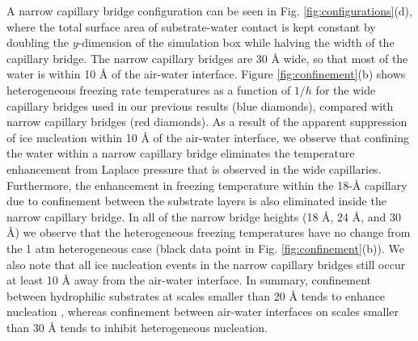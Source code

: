\documentclass[journal abbreviation, manuscript]{copernicus}
\providecommand{\DIFadd}[1]{{\protect\color{blue}\uwave{#1}}} %
\providecommand{\DIFaddbegin}{} %
\providecommand{\DIFaddend}{} %
\begin{document}
\DIFaddend A narrow capillary bridge configuration can be seen in Fig. \ref{fig:configurations}(d), where the total surface area of substrate-water contact is kept constant by doubling the $y$-dimension of the simulation box while halving the width of the capillary bridge. The narrow capillary bridges are 30 \AA{} wide, so that most of the water is within 10 \AA{} of the air-water interface. Figure \ref{fig:confinement}(b) shows heterogeneous freezing rate temperatures as a function of $1/h$ for the wide capillary bridges used in our previous results (blue diamonds), compared with narrow capillary bridges (red diamonds). As a result of the apparent suppression of ice nucleation within 10 \AA{} of the air-water interface, we observe that confining the water within a narrow capillary bridge eliminates the temperature enhancement from Laplace pressure that is observed in the wide capillaries. Furthermore, the enhancement in freezing temperature within the 18-\AA{} capillary due to confinement between the substrate layers is also eliminated inside the narrow capillary bridge. In all of the narrow bridge heights (18 \AA{}, 24 \AA{}, and 30 \AA{}) we observe that the heterogeneous freezing temperatures have no change from the 1 atm heterogeneous case (black data point in Fig. \ref{fig:confinement}(b)). We also note that all ice nucleation events in the narrow capillary bridges still occur at least 10 \AA{} away from the air-water interface. In summary, confinement between hydrophilic substrates at scales smaller than 20 \AA{} tends to enhance nucleation \DIFaddbegin \DIFadd{in the MLmW model}\DIFaddend , whereas confinement between air-water interfaces on scales smaller than 30 \AA{} tends to inhibit heterogeneous nucleation.
\end{document}
